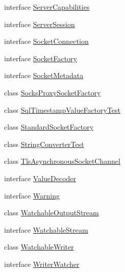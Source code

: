 \begin{DoxyCompactItemize}
\item 
interface \mbox{\hyperlink{interfacecom_1_1mysql_1_1cj_1_1protocol_1_1_server_capabilities}{Server\+Capabilities}}
\item 
interface \mbox{\hyperlink{interfacecom_1_1mysql_1_1cj_1_1protocol_1_1_server_session}{Server\+Session}}
\item 
interface \mbox{\hyperlink{interfacecom_1_1mysql_1_1cj_1_1protocol_1_1_socket_connection}{Socket\+Connection}}
\item 
interface \mbox{\hyperlink{interfacecom_1_1mysql_1_1cj_1_1protocol_1_1_socket_factory}{Socket\+Factory}}
\item 
interface \mbox{\hyperlink{interfacecom_1_1mysql_1_1cj_1_1protocol_1_1_socket_metadata}{Socket\+Metadata}}
\item 
class \mbox{\hyperlink{classcom_1_1mysql_1_1cj_1_1protocol_1_1_socks_proxy_socket_factory}{Socks\+Proxy\+Socket\+Factory}}
\item 
class \mbox{\hyperlink{classcom_1_1mysql_1_1cj_1_1protocol_1_1_sql_timestamp_value_factory_test}{Sql\+Timestamp\+Value\+Factory\+Test}}
\item 
class \mbox{\hyperlink{classcom_1_1mysql_1_1cj_1_1protocol_1_1_standard_socket_factory}{Standard\+Socket\+Factory}}
\item 
class \mbox{\hyperlink{classcom_1_1mysql_1_1cj_1_1protocol_1_1_string_converter_test}{String\+Converter\+Test}}
\item 
class \mbox{\hyperlink{classcom_1_1mysql_1_1cj_1_1protocol_1_1_tls_asynchronous_socket_channel}{Tls\+Asynchronous\+Socket\+Channel}}
\item 
interface \mbox{\hyperlink{interfacecom_1_1mysql_1_1cj_1_1protocol_1_1_value_decoder}{Value\+Decoder}}
\item 
interface \mbox{\hyperlink{interfacecom_1_1mysql_1_1cj_1_1protocol_1_1_warning}{Warning}}
\item 
class \mbox{\hyperlink{classcom_1_1mysql_1_1cj_1_1protocol_1_1_watchable_output_stream}{Watchable\+Output\+Stream}}
\item 
interface \mbox{\hyperlink{interfacecom_1_1mysql_1_1cj_1_1protocol_1_1_watchable_stream}{Watchable\+Stream}}
\item 
class \mbox{\hyperlink{classcom_1_1mysql_1_1cj_1_1protocol_1_1_watchable_writer}{Watchable\+Writer}}
\item 
interface \mbox{\hyperlink{interfacecom_1_1mysql_1_1cj_1_1protocol_1_1_writer_watcher}{Writer\+Watcher}}
\end{DoxyCompactItemize}
